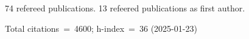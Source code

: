 74 refereed publications. 13 refeered publications as first author.

Total citations~=~4600; h-index~=~36 (2025-01-23)